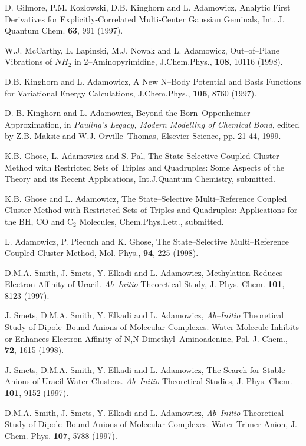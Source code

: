\begin{thebibliography}{999}
D. Gilmore, P.M. Kozlowski, D.B. Kinghorn and 
L. Adamowicz, Analytic First Derivatives for
Explicitly-Correlated Multi-Center Gaussian Geminals, 
Int. J. Quantum Chem. {\bf 63}, 991 (1997).

W.J. McCarthy, L. Lapinski, M.J. Nowak and L. Adamowicz,
Out--of--Plane Vibrations of $NH_2$ in 2--Aminopyrimidine, 
J.Chem.Phys., {\bf 108}, 10116 (1998).  

D.B. Kinghorn and L. Adamowicz,
A New N--Body Potential and Basis Functions for
Variational Energy Calculations,
J.Chem.Phys., {\bf 106}, 8760 (1997).

D. B. Kinghorn and L. Adamowicz, 
Beyond the Born--Oppenheimer Approximation,
in {\em Pauling's Legacy,
Modern Modelling of Chemical Bond}, 
edited by Z.B. Maksic and W.J. Orville--Thomas,
Elsevier Science, pp. 21-44, 1999.

K.B. Ghose, L. Adamowicz and S. Pal,
The State Selective Coupled Cluster Method with
Restricted Sets of Triples and Quadruples:
Some Aspects of the Theory and its Recent Applications,
Int.J.Quantum Chemistry, submitted.

K.B. Ghose and L. Adamowicz,
The State--Selective Multi--Reference Coupled Cluster
Method with Restricted Sets of Triples and Quadruples:
Applications for the BH, CO and C$_2$ Molecules,
Chem.Phys.Lett., submitted.


L. Adamowicz, P. Piecuch and K. Ghose, 
The State--Selective Multi--Reference
Coupled Cluster Method, Mol. Phys., 
{\bf 94}, 225 (1998).



D.M.A. Smith, J. Smets, Y. Elkadi and 
L. Adamowicz, Methylation Reduces
Electron Affinity of Uracil.  {\it Ab--Initio} 
Theoretical Study, J. Phys. Chem.
{\bf 101}, 8123 (1997).

J. Smets, D.M.A. Smith, Y. Elkadi 
and L. Adamowicz, {\it Ab--Initio} Theoretical Study
of Dipole--Bound Anions of Molecular 
Complexes.  Water Molecule Inhibits or
Enhances Electron Affinity of N,N-Dimethyl--Aminoadenine, 
Pol. J. Chem., {\bf 72}, 1615 (1998). 

J. Smets, D.M.A. Smith, Y. Elkadi and 
L. Adamowicz, The Search for Stable
Anions of Uracil Water Clusters.  {\it Ab--Initio} 
Theoretical Studies, J. Phys. Chem.
{\bf 101}, 9152 (1997).

D.M.A. Smith, J. Smets, Y. Elkadi and 
L. Adamowicz, {\it Ab--Initio} Theoretical Study
of Dipole--Bound Anions of Molecular 
Complexes.  Water Trimer Anion, J. Chem.
Phys.
{\bf 107}, 5788 (1997).


\end{thebibliography}
